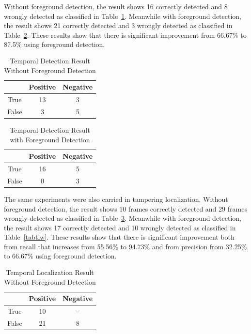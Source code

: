 \documentclass[conference]{IEEEtran}
\begin{document}
Without foreground detection, the result shows 16 correctly detected and 8 wrongly detected as classified in Table~\ref{tabtdwo}. Meanwhile with foreground detection, the result shows 21 correctly detected and 3 wrongly detected as classified in Table~\ref{tabtdw}. These results show that there is significant improvement from 66.67\% to 87.5\% using foreground detection.

\begin{table}[htbp]
\centering
\caption{Temporal Detection Result Without Foreground Detection}
\begin{tabular}{|c|c|c|}
\hline
& Positive & Negative \\
\hline
True & 13& 3\\
\hline
False & 3& 5\\
\hline
\end{tabular}
\label{tabtdwo}
\end{table}

\begin{table}[htbp]
\centering
\caption{Temporal Detection Result with Foreground Detection}
\begin{tabular}{|c|c|c|}
\hline
& Positive & Negative \\
\hline
True & 16& 5\\
\hline
False & 0& 3\\
\hline
\end{tabular}
\label{tabtdw}
\end{table}

The same experiments were also carried in tampering localization. Without foreground detection, the result shows 10 frames correctly detected and 29 frames wrongly detected as classified in Table~\ref{tabtlwo}. Meanwhile with foreground detection, the result shows 17 correctly detected and 10 wrongly detected as classified in Table~\ref{tabtlw}. These results show that there is significant improvement both from recall that increases from 55.56\% to 94.73\% and from precision from 32.25\% to 66.67\% using foreground detection.

\begin{table}[htbp]
\centering
\caption{Temporal Localization Result Without Foreground Detection}
\begin{tabular}{|c|c|c|}
\hline
& Positive & Negative \\
\hline
True & 10& -\\
\hline
False & 21& 8\\
\hline
\end{tabular}
\label{tabtlwo}
\end{table}
\end{document}
